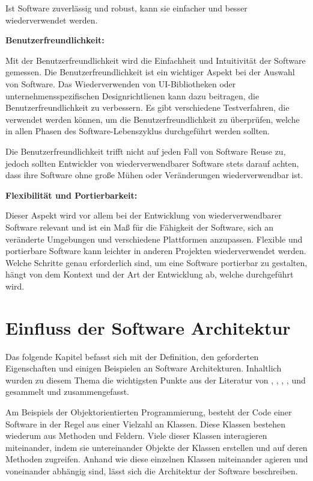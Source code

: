 \documentclass[utf8,biblatex]{lni}
\begin{document}
    Ist Software zuverlässig und robust, kann sie einfacher und besser wiederverwendet werden.
    
    \textbf{Benutzerfreundlichkeit:}
    
    Mit der Benutzerfreundlichkeit wird die Einfachheit und Intuitivität der Software gemessen. Die Benutzerfreundlichkeit ist ein wichtiger Aspekt bei der Auswahl von Software. Das Wiederverwenden von UI-Bibliotheken oder unternehmensspezifischen Designrichtlienen kann dazu beitragen, die Benutzerfreundlichkeit zu verbessern. Es gibt verschiedene Testverfahren, die verwendet werden können, um die Benutzerfreundlichkeit zu überprüfen, welche in allen Phasen des Software-Lebenszyklus durchgeführt werden sollten. 
    
    Die Benutzerfreundlichkeit trifft nicht auf jeden Fall von Software Reuse zu, jedoch sollten Entwickler von wiederverwendbarer Software stets darauf achten, dass ihre Software ohne große Mühen oder Veränderungen wiederverwendbar ist.
    
    \textbf{Flexibilität und Portierbarkeit:}
    
    Dieser Aspekt wird vor allem bei der Entwicklung von wiederverwendbarer Software relevant und ist ein Maß für die Fähigkeit der Software, sich an veränderte Umgebungen und verschiedene Plattformen anzupassen. Flexible und portierbare Software kann leichter in anderen Projekten wiederverwendet werden. Welche Schritte genau erforderlich sind, um eine Software portierbar zu gestalten, hängt von dem Kontext und der Art der Entwicklung ab, welche durchgeführt wird. 
    


\section{Einfluss der Software Architektur}

Das folgende Kapitel befasst sich mit der Definition, den geforderten Eigenschaften und einigen Beispielen an Software Architekturen. Inhaltlich wurden zu diesem Thema die wichtigsten Punkte aus der Literatur von \citet{Appelrath.2012}, \citet{Bauer.2008}, \citet{Dowalil.2020}, \citet{Goll.2011}\cite{Goll.2014}, \citet{Starke.2011}\cite{Starke.2020} und \citet{Tremp.2021} gesammelt und zusammengefasst.


Am Beispiels der Objektorientierten Programmierung, besteht der Code einer Software in der Regel aus einer Vielzahl an Klassen. Diese Klassen bestehen wiederum aus Methoden und Feldern. Viele dieser Klassen interagieren miteinander, indem sie untereinander Objekte der Klassen erstellen und auf deren Methoden zugreifen. Anhand wie diese einzelnen Klassen miteinander agieren und voneinander abhängig sind, lässt sich die Architektur der Software beschreiben.
\end{document}
